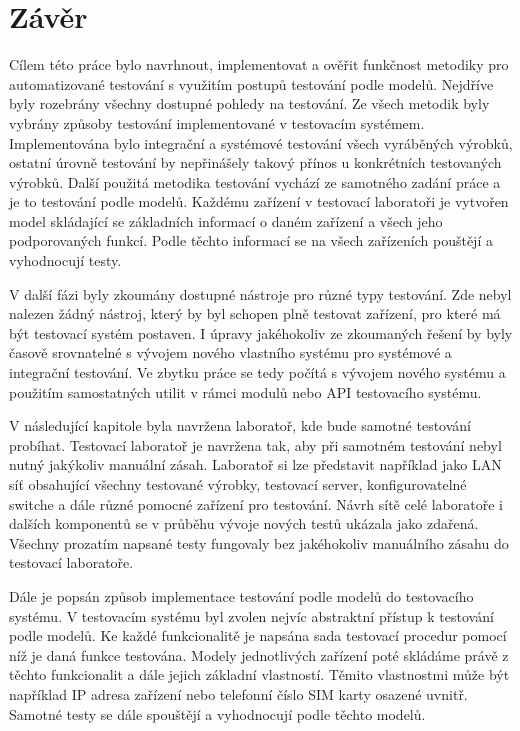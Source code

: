 \chapter{Závěr}
Cílem této práce bylo navrhnout, implementovat a ověřit funkčnost metodiky pro automatizované testování s využitím postupů testování podle modelů. Nejdříve byly rozebrány všechny dostupné pohledy na testování. Ze všech metodik byly vybrány způsoby testování implementované v testovacím systémem. Implementována bylo integrační a systémové testování všech vyráběných výrobků, ostatní úrovně testování by nepřinášely takový přínos u konkrétních testovaných výrobků. Další použitá metodika testování vychází ze samotného zadání práce a je to testování podle modelů. Každému zařízení v testovací laboratoři je vytvořen model skládající se základních informací o daném zařízení a všech jeho podporovaných funkcí. Podle těchto informací se na všech zařízeních pouštějí a vyhodnocují testy.

V další fázi byly zkoumány dostupné nástroje pro různé typy testování. Zde nebyl nalezen žádný nástroj, který by byl schopen plně testovat zařízení, pro které má být testovací systém postaven. I úpravy jakéhokoliv ze zkoumaných řešení by byly časově srovnatelné s vývojem nového vlastního systému pro systémové a integrační testování. Ve zbytku práce se tedy počítá s vývojem nového systému a použitím samostatných utilit v rámci modulů nebo API testovacího systému.

V následující kapitole byla navržena laboratoř, kde bude samotné testování probíhat. Testovací laboratoř je navržena tak, aby při samotném testování nebyl nutný jakýkoliv manuální zásah. Laboratoř si lze představit například jako LAN síť obsahující všechny testované výrobky, testovací server, konfigurovatelné switche a dále různé pomocné zařízení pro testování. Návrh sítě celé laboratoře i dalších komponentů se v průběhu vývoje nových testů ukázala jako zdařená. Všechny prozatím napsané testy fungovaly bez jakéhokoliv manuálního zásahu do testovací laboratoře.

Dále je popsán způsob implementace testování podle modelů do testovacího systému. V testovacím systému byl zvolen nejvíc abstraktní přístup k testování podle modelů. Ke každé funkcionalitě je napsána sada testovací procedur pomocí níž je daná funkce testována. Modely jednotlivých zařízení poté skládáme právě z těchto funkcionalit a dále jejich základní vlastností. Těmito vlastnostmi může být například IP adresa zařízení nebo telefonní číslo SIM karty osazené uvnitř. Samotné testy se dále spouštějí a vyhodnocují podle těchto modelů.

